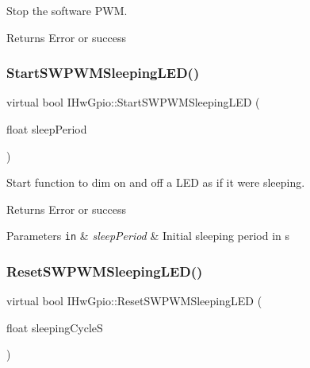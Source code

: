Stop the software P\+WM. 

\begin{DoxyReturn}{Returns}
Error or success 
\end{DoxyReturn}
\mbox{\label{classIHwGpio_ac62a0fbeb1836d7f512a964f92639bfb}} 
\subsubsection{\texorpdfstring{Start\+S\+W\+P\+W\+M\+Sleeping\+L\+E\+D()}{StartSWPWMSleepingLED()}}
{\footnotesize\ttfamily virtual bool I\+Hw\+Gpio\+::\+Start\+S\+W\+P\+W\+M\+Sleeping\+L\+ED (\begin{DoxyParamCaption}\item[{float}]{sleep\+Period }\end{DoxyParamCaption})\hspace{0.3cm}{\ttfamily [pure virtual]}}



Start function to dim on and off a L\+ED as if it were sleeping. 

\begin{DoxyReturn}{Returns}
Error or success 
\end{DoxyReturn}

\begin{DoxyParams}[1]{Parameters}
\mbox{\tt in}  & {\em sleep\+Period} & Initial sleeping period in s \\
\hline
\end{DoxyParams}
\mbox{\label{classIHwGpio_a897e1e8f2dc07a57451f1d8286c50261}} 
\subsubsection{\texorpdfstring{Reset\+S\+W\+P\+W\+M\+Sleeping\+L\+E\+D()}{ResetSWPWMSleepingLED()}}
{\footnotesize\ttfamily virtual bool I\+Hw\+Gpio\+::\+Reset\+S\+W\+P\+W\+M\+Sleeping\+L\+ED (\begin{DoxyParamCaption}\item[{float}]{sleeping\+CycleS }\end{DoxyParamCaption})\hspace{0.3cm}{\ttfamily [pure virtual]}}



